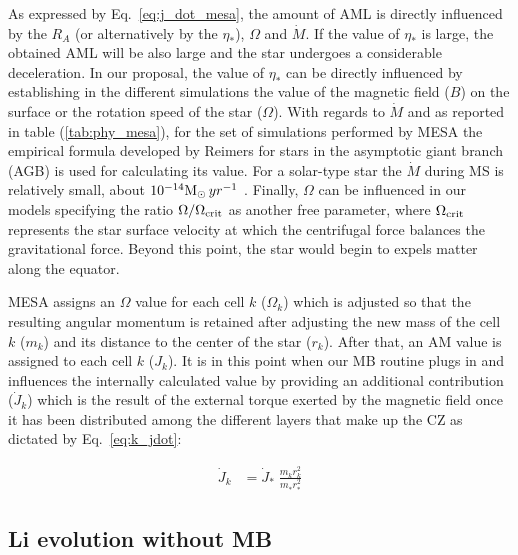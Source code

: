 \documentclass[fleqn,usenatbib]{mnras}
\begin{document}
As expressed by Eq.~\ref{eq:j_dot_mesa}, the amount of AML is directly influenced by the $R_A$ (or alternatively by the $\eta_*$), $\Omega$ and $\Dot{M}$. If the value of $\eta_*$ is large, the obtained AML will be also large and the star undergoes a considerable deceleration. In our proposal, the value of $\eta_*$ can be directly influenced by establishing in the different simulations the value of the magnetic field ($B$) on the surface or the rotation speed of the star ($\Omega$). With regards to $\Dot{M}$ and as reported in table (\ref{tab:phy_mesa}), for the set of simulations performed by MESA the empirical formula developed by Reimers \citep{Reimers1975} for stars in the asymptotic giant branch (AGB) is used for calculating its value. For a solar-type star the $\Dot{M}$ during MS is relatively small, about  $10^{-14}\mathrm{M}_\odot \, yr^{-1}$ \citep{Noerdlinger2008}. Finally, $\Omega$ can be influenced in our models specifying the ratio $\Omega / \Omega_{\mathrm{crit}}$ as another free parameter, where  $\Omega_{\mathrm{crit}}$ represents the star surface velocity at which the centrifugal force balances  the gravitational force. Beyond this point, the star would begin to expels matter along the equator.\par

MESA assigns an $\Omega$ value for each cell $k$ ($\Omega_k$) which is adjusted so that the resulting angular momentum is retained after adjusting the new mass of the cell $k$ ($m_k$) and its distance to the center of the star ($r_k$). After that, an AM value is assigned to each cell $k$ ($J_k$). It is in this point when our MB routine plugs in and influences the internally calculated value by providing an additional contribution ($\Dot{J}_{k}$) which is the result of the external torque exerted by the magnetic field once it has been distributed among the different layers that make up the CZ as dictated by Eq.~\ref{eq:k_jdot}:\par
 
\begin{ceqn}
\begin{align}
    \Dot{J}_{k} &= \Dot{J}_*\;\frac{m^{}_{k} r^2_{k}}{m^{}_* r_*^2} \label{eq:k_jdot}
\end{align}
\end{ceqn}


\subsection{Li evolution without MB}
\end{document}
